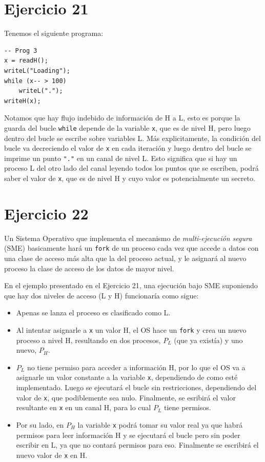\documentclass[11pt]{article}
\begin{document}
\section*{Ejercicio 21}
Tenemos el siguiente programa:

\begin{verbatim}
-- Prog 3
x = readH();
writeL("Loading");
while (x-- > 100)
    writeL(".");
writeH(x);
\end{verbatim}

Notamos que hay flujo indebido de información de H a L, esto es porque la guarda del bucle \verb|while| 
depende de la variable \verb|x|, que es de nivel H, pero luego dentro del bucle se escribe sobre 
variables L. Más explicitamente, la condición del bucle va decreciendo el valor de \verb|x| en cada 
iteración y luego dentro del bucle se imprime un punto \verb|"."| en un canal de nivel L. Esto 
significa que si hay un proceso L del otro lado del canal leyendo todos los puntos que se escriben, 
podrá saber el valor de \verb|x|, que es de nivel H y cuyo valor es potencialmente un secreto.

\section*{Ejercicio 22}
Un Sistema Operativo que implementa el mecanismo de \textit{multi-ejecución segura} (SME) basicamente 
hará un \verb|fork| de un proceso cada vez que accede a datos con una clase de acceso más alta que la 
del proceso actual, y le asignará al nuevo proceso la clase de acceso de los datos de mayor nivel. 

En el ejemplo presentado en el Ejercicio 21, una ejecución bajo SME suponiendo que hay dos niveles 
de acceso (L y H) funcionaría como sigue:

\begin{itemize}
    \item Apenas se lanza el proceso es clasificado como L.
    \item Al intentar asignarle a \verb|x| un valor H, el OS hace un \verb|fork| y crea un nuevo proceso a nivel H, resultando en dos procesos, $P_L$ (que ya existía) y uno nuevo, $P_H$.
    \item $P_L$ no tiene permiso para acceder a información H, por lo que el OS va a asignarle un valor constante a la variable \verb|x|, dependiendo de como esté implementado. Luego se ejecutará el bucle sin restricciones, dependiendo del valor de \verb|x|, que podiblemente sea nulo. Finalmente, se esribirá el valor resultante en \verb|x| en un canal H, para lo cual $P_L$ tiene permisos.
    \item Por su lado, en $P_H$ la variable \verb|x| podrá tomar su valor real ya que habrá permisos para leer información H y se ejecutará el bucle pero sin poder escribir en L, ya que no contará permisos para eso. Finalmente se escribirá el nuevo valor de \verb|x| en H.
\end{itemize}
\end{document}
